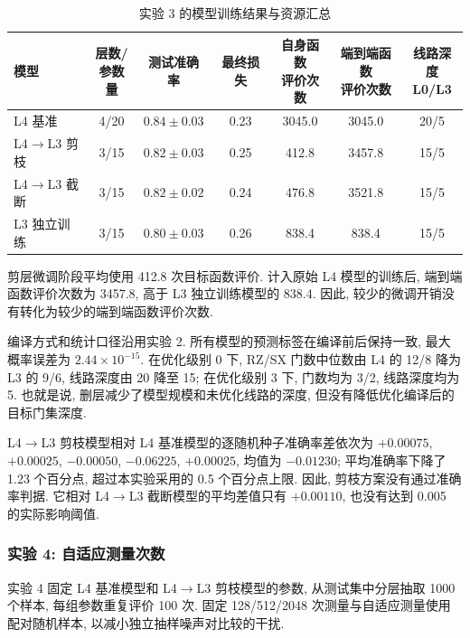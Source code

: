 \documentclass[a4paper]{ctexart}
\begin{document}
\begin{table}[H]
    \centering
    \caption{实验 3 的模型训练结果与资源汇总}
    \renewcommand{\arraystretch}{1.2}
    \begin{tabular*}{\textwidth}{@{\extracolsep{\fill}}lcccccc@{}}
        \toprule
        模型 & \shortstack{层数/\\参数量} & 测试准确率 & 最终损失 & \shortstack{自身函数\\评价次数} & \shortstack{端到端函数\\评价次数} & \shortstack{线路深度\\L0/L3} \\
        \midrule
        L4 基准 & 4/20 & $0.84\pm0.03$ & 0.23 & 3045.0 & 3045.0 & 20/5 \\
        L4$\to$L3 剪枝 & 3/15 & $0.82\pm0.03$ & 0.25 & 412.8 & 3457.8 & 15/5 \\
        L4$\to$L3 截断 & 3/15 & $0.82\pm0.02$ & 0.24 & 476.8 & 3521.8 & 15/5 \\
        L3 独立训练 & 3/15 & $0.80\pm0.03$ & 0.26 & 838.4 & 838.4 & 15/5 \\
        \bottomrule
    \end{tabular*}
\end{table}

剪层微调阶段平均使用 412.8 次目标函数评价. 计入原始 L4 模型的训练后, 端到端函数评价次数为 3457.8, 高于 L3 独立训练模型的 838.4. 因此, 较少的微调开销没有转化为较少的端到端函数评价次数.

编译方式和统计口径沿用实验 2. 所有模型的预测标签在编译前后保持一致, 最大概率误差为 $2.44\times10^{-15}$. 在优化级别 0 下, RZ/SX 门数中位数由 L4 的 12/8 降为 L3 的 9/6, 线路深度由 20 降至 15; 在优化级别 3 下, 门数均为 3/2, 线路深度均为 5. 也就是说, 删层减少了模型规模和未优化线路的深度, 但没有降低优化编译后的目标门集深度.

L4$\to$L3 剪枝模型相对 L4 基准模型的逐随机种子准确率差依次为 $+0.00075$, $+0.00025$, $-0.00050$, $-0.06225$, $+0.00025$, 均值为 $-0.01230$; 平均准确率下降了 1.23 个百分点, 超过本实验采用的 0.5 个百分点上限. 因此, 剪枝方案没有通过准确率判据. 它相对 L4$\to$L3 截断模型的平均差值只有 $+0.00110$, 也没有达到 0.005 的实际影响阈值.

\subsubsection{实验 4: 自适应测量次数}

实验 4 固定 L4 基准模型和 L4$\to$L3 剪枝模型的参数, 从测试集中分层抽取 1000 个样本, 每组参数重复评价 100 次. 固定 128/512/2048 次测量与自适应测量使用配对随机样本, 以减小独立抽样噪声对比较的干扰.
\end{document}
